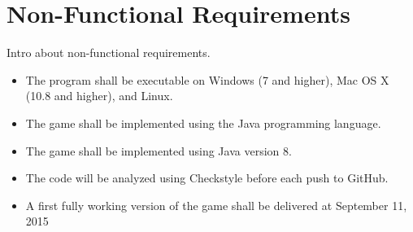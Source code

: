\section{Non-Functional Requirements}

Intro about non-functional requirements.

\begin{itemize}
	\item The program shall be executable on Windows (7 and higher), Mac OS X (10.8 and higher), and Linux.
	\item The game shall be implemented using the Java programming language.
	\item The game shall be implemented using Java version 8.
	\item The code will be analyzed using Checkstyle before each push to GitHub.
	\item A first fully working version of the game shall be delivered at September 11, 2015
\end{itemize}